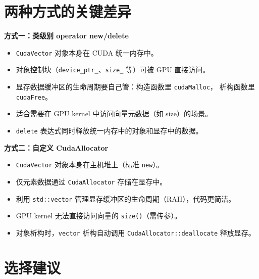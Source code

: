 \documentclass[12pt,a4paper,fontset=fandol]{ctexbook}
\begin{document}
\section{两种方式的关键差异}

\begin{compare}[title=new/delete 重载 vs Allocator 封装]
\textbf{方式一：类级别 operator new/delete}
\begin{itemize}
    \item \texttt{CudaVector} 对象本身在 CUDA 统一内存中。
    \item 对象控制块（\texttt{device\_ptr\_}、\texttt{size\_} 等）可被 GPU 直接访问。
    \item 显存数据缓冲区的生命周期要自己管：构造函数里 \texttt{cudaMalloc}，
          析构函数里 \texttt{cudaFree}。
    \item 适合需要在 GPU kernel 中访问向量元数据（如 size）的场景。
    \item \texttt{delete} 表达式同时释放统一内存中的对象和显存中的数据。
\end{itemize}

\textbf{方式二：自定义 CudaAllocator}
\begin{itemize}
    \item \texttt{CudaVector} 对象本身在主机堆上（标准 \texttt{new}）。
    \item 仅元素数据通过 \texttt{CudaAllocator} 存储在显存中。
    \item 利用 \texttt{std::vector} 管理显存缓冲区的生命周期（RAII），代码更简洁。
    \item GPU kernel 无法直接访问向量的 \texttt{size()}（需传参）。
    \item 对象析构时，\texttt{vector} 析构自动调用 \texttt{CudaAllocator::deallocate} 释放显存。
\end{itemize}
\end{compare}

\section{选择建议}
\end{document}
